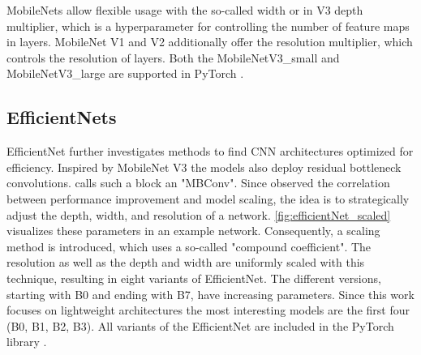 MobileNets allow flexible usage with the so-called width or in V3 depth multiplier, which is a hyperparameter for controlling the number of feature maps in layers.
MobileNet V1 and V2 additionally offer the resolution multiplier, which controls the resolution of layers.
Both the MobileNetV3\_small and MobileNetV3\_large are supported in PyTorch \cite{pytorchmobilenetv3}.
\clearpage
\subsection{EfficientNets}

EfficientNet \cite{EfficientNet} further investigates methods to find \ac{CNN} architectures optimized for efficiency.
Inspired by MobileNet V3 the models also deploy residual bottleneck convolutions.
\cite{EfficientNet} calls such a block an "MBConv".
Since \cite{EfficientNet} observed the correlation between performance improvement and model scaling, the idea is to strategically adjust the depth, width, and resolution of a network.
\autoref{fig:efficientNet_scaled} visualizes these parameters in an example network.
Consequently, a scaling method is introduced, which uses a so-called "compound coefficient".
The resolution as well as the depth and width are uniformly scaled with this technique, resulting in eight variants of EfficientNet.
The different versions, starting with B0 and ending with B7, have increasing parameters.
Since this work focuses on lightweight architectures the most interesting models are the first four (B0, B1, B2, B3).
All variants of the EfficientNet are included in the PyTorch library \cite{pytorchefficientNets}.


